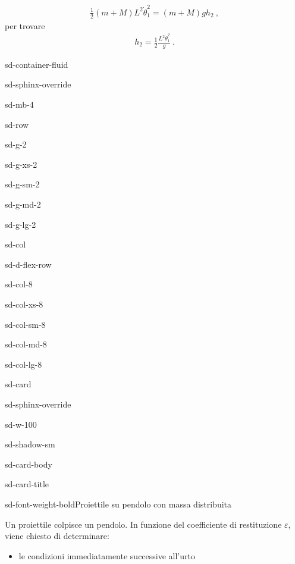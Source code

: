 \documentclass[letterpaper,10pt,italian]{jupyterBook}
\begin{document}
\begin{equation*}
\begin{split}\frac{1}{2} (m+M) L^2 \dot{\theta}_1^2 = (m + M) g h_2 \ ,\end{split}
\end{equation*}
\sphinxAtStartPar
per trovare
\begin{equation*}
\begin{split}h_2 = \frac{1}{2} \frac{L^2 \dot{\theta}_1^2}{g} \ .\end{split}
\end{equation*}


\begin{sphinxuseclass}{sd-container-fluid}
\begin{sphinxuseclass}{sd-sphinx-override}
\begin{sphinxuseclass}{sd-mb-4}
\begin{sphinxuseclass}{sd-row}
\begin{sphinxuseclass}{sd-g-2}
\begin{sphinxuseclass}{sd-g-xs-2}
\begin{sphinxuseclass}{sd-g-sm-2}
\begin{sphinxuseclass}{sd-g-md-2}
\begin{sphinxuseclass}{sd-g-lg-2}
\begin{sphinxuseclass}{sd-col}
\begin{sphinxuseclass}{sd-d-flex-row}
\begin{sphinxuseclass}{sd-col-8}
\begin{sphinxuseclass}{sd-col-xs-8}
\begin{sphinxuseclass}{sd-col-sm-8}
\begin{sphinxuseclass}{sd-col-md-8}
\begin{sphinxuseclass}{sd-col-lg-8}
\begin{sphinxuseclass}{sd-card}
\begin{sphinxuseclass}{sd-sphinx-override}
\begin{sphinxuseclass}{sd-w-100}
\begin{sphinxuseclass}{sd-shadow-sm}
\begin{sphinxuseclass}{sd-card-body}
\begin{sphinxuseclass}{sd-card-title}
\begin{sphinxuseclass}{sd-font-weight-bold}Proiettile su pendolo con massa distribuita
\end{sphinxuseclass}
\end{sphinxuseclass}
\sphinxAtStartPar
Un proiettile colpisce un pendolo. In funzione del coefficiente di restituzione \(\varepsilon\), viene chiesto di determinare:
\begin{itemize}
\item {} 
\sphinxAtStartPar
le condizioni immediatamente successive all’urto


\end{itemize}
\end{sphinxuseclass}
\end{sphinxuseclass}
\end{sphinxuseclass}
\end{sphinxuseclass}
\end{sphinxuseclass}
\end{sphinxuseclass}
\end{sphinxuseclass}
\end{sphinxuseclass}
\end{sphinxuseclass}
\end{sphinxuseclass}
\end{sphinxuseclass}
\end{sphinxuseclass}
\end{sphinxuseclass}
\end{sphinxuseclass}
\end{sphinxuseclass}
\end{sphinxuseclass}
\end{sphinxuseclass}
\end{sphinxuseclass}
\end{sphinxuseclass}
\end{sphinxuseclass}
\end{sphinxuseclass}
\end{document}
